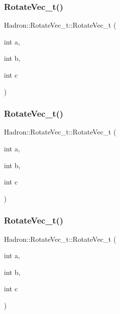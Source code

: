 \subsubsection{\texorpdfstring{RotateVec\_t()}{RotateVec\_t()}\hspace{0.1cm}{\footnotesize\ttfamily [1/3]}}
{\footnotesize\ttfamily Hadron\+::\+Rotate\+Vec\+\_\+t\+::\+Rotate\+Vec\+\_\+t (\begin{DoxyParamCaption}\item[{int}]{a,  }\item[{int}]{b,  }\item[{int}]{c }\end{DoxyParamCaption})\hspace{0.3cm}{\ttfamily [inline]}}

\mbox{\label{structHadron_1_1RotateVec__t_a137f265a3fb53776d2ee401044aab1fa}} 
\subsubsection{\texorpdfstring{RotateVec\_t()}{RotateVec\_t()}\hspace{0.1cm}{\footnotesize\ttfamily [2/3]}}
{\footnotesize\ttfamily Hadron\+::\+Rotate\+Vec\+\_\+t\+::\+Rotate\+Vec\+\_\+t (\begin{DoxyParamCaption}\item[{int}]{a,  }\item[{int}]{b,  }\item[{int}]{c }\end{DoxyParamCaption})\hspace{0.3cm}{\ttfamily [inline]}}

\mbox{\label{structHadron_1_1RotateVec__t_a137f265a3fb53776d2ee401044aab1fa}} 
\subsubsection{\texorpdfstring{RotateVec\_t()}{RotateVec\_t()}\hspace{0.1cm}{\footnotesize\ttfamily [3/3]}}
{\footnotesize\ttfamily Hadron\+::\+Rotate\+Vec\+\_\+t\+::\+Rotate\+Vec\+\_\+t (\begin{DoxyParamCaption}\item[{int}]{a,  }\item[{int}]{b,  }\item[{int}]{c }\end{DoxyParamCaption})\hspace{0.3cm}{\ttfamily [inline]}}



